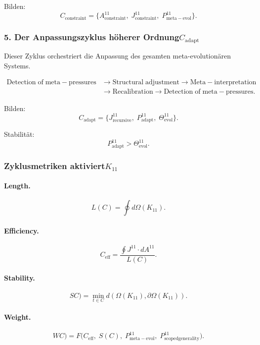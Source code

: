 Bilden:
\[
 C_{\mathrm{constraint}}
 =
 \{
   A^{11}_{\mathrm{constraint}},\;
   J^{11}_{\mathrm{constraint}},\;
   P^{11}_{\mathrm{meta\!-\!evol}}
 \}.
\]


\subsubsection{5. Der Anpassungszyklus höherer Ordnung$C_{\mathrm{adapt}}$}

Dieser Zyklus orchestriert die Anpassung des gesamten meta-evolutionären Systems.

\[
  \begin{aligned}
  \mathrm{Detection\;of\;meta\!-\!pressures}
  &\to \mathrm{Structural\;adjustment}
  \to \mathrm{Meta\!-\!interpretation}\\
  &\to \mathrm{Recalibration}
  \to \mathrm{Detection\;of\;meta\!-\!pressures}.
  \end{aligned}
\]

Bilden:
\[
  C_{\mathrm{adapt}}
  =
  \{
    J^{11}_{\mathrm{recursive}},\;
    P^{11}_{\mathrm{adapt}},\;
    \Theta^{11}_{\mathrm{evol}}
  \}.
\]

Stabilität:
\[
  P^{11}_{\mathrm{adapt}}>\Theta^{11}_{\mathrm{evol}}.
\]


\subsubsection{Zyklusmetriken aktiviert$K_{11}$}

\paragraph{Length.}
\[
  L(C)=\oint d\Omega(K_{11}).
\]

\paragraph{Efficiency.}
\[
  C_{\mathrm{eff}}
  =\frac{\oint J^{11}\cdot dA^{11}}{L(C)}.
\]

\paragraph{Stability.}
\[
SC)
  =\min_{t\in C} d(\Omega(K_{11}),\partial\Omega(K_{11})).
\]

\paragraph{Weight.}
\[
WC)
  =F\!\big(
        C_{\mathrm{eff}},\;
        S(C),\;
        P^{11}_{\mathrm{meta\!-\!evol}},\;
        P^{11}_{\mathrm{scoped generality}}
      \big).
\]


